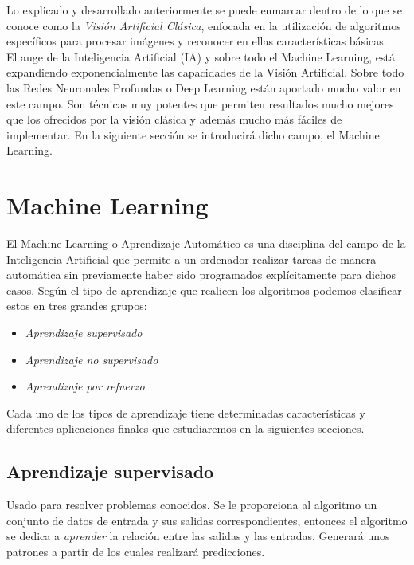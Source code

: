 Lo explicado y desarrollado anteriormente se puede enmarcar dentro de lo que se conoce como la \textit{Visión Artificial Clásica}, enfocada en la utilización de algoritmos específicos para procesar imágenes y reconocer en ellas características básicas.\\

El auge de la Inteligencia Artificial (IA) y sobre todo el Machine Learning, está expandiendo exponencialmente las capacidades de la Visión Artificial. Sobre todo las Redes Neuronales Profundas o Deep Learning están aportado mucho valor en este campo. Son técnicas muy potentes que permiten resultados mucho mejores que los ofrecidos por la visión clásica y además mucho más fáciles de implementar. En la siguiente sección se introducirá dicho campo, el Machine Learning.

\section{Machine Learning}

El Machine Learning o Aprendizaje Automático es una disciplina del campo de la Inteligencia Artificial que permite a un ordenador realizar tareas de manera automática sin previamente haber sido programados explícitamente para dichos casos. Según el tipo de aprendizaje que realicen los algoritmos podemos clasificar estos en tres grandes grupos:

\begin{itemize}
\item \textit{Aprendizaje supervisado}
\item \textit{Aprendizaje no supervisado} 
\item \textit{Aprendizaje por refuerzo} 
\end{itemize}

Cada uno de los tipos de aprendizaje tiene determinadas características y diferentes aplicaciones finales que estudiaremos en la siguientes secciones.

\subsection{Aprendizaje supervisado}

Usado para resolver problemas conocidos. Se le proporciona al algoritmo un conjunto de datos de entrada y sus salidas correspondientes, entonces el algoritmo se dedica a \textit{aprender} la relación entre las salidas y las entradas. Generará unos patrones a partir de los cuales realizará predicciones.\\

